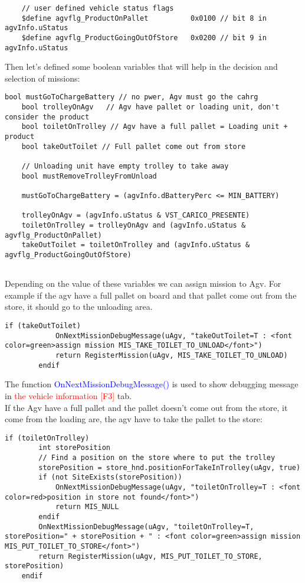 \begin{lstlisting}
	// user defined vehicle status flags
	$define agvflg_ProductOnPallet			0x0100 // bit 8 in agvInfo.uStatus
	$define agvflg_ProductGoingOutOfStore	0x0200 // bit 9 in agvInfo.uStatus
\end{lstlisting}

Then let's defined some boolean variables that will help in the decision and selection of missions:

\begin{lstlisting}[caption = Desision variables or plant status]
	bool mustGoToChargeBattery // no pwer, Agv must go the cahrg
	bool trolleyOnAgv	// Agv have pallet or loading unit, don't consider the product
	bool toiletOnTrolley // Agv have a full pallet = Loading unit + product
	bool takeOutToilet // Full pallet come out from store
	
	// Unloading unit have empty trolley to take away
	bool mustRemoveTrolleyFromUnload
	
	mustGoToChargeBattery = (agvInfo.dBatteryPerc <= MIN_BATTERY)
	
	trolleyOnAgv = (agvInfo.uStatus & VST_CARICO_PRESENTE)
	toiletOnTrolley = trolleyOnAgv and (agvInfo.uStatus & agvflg_ProductOnPallet)
	takeOutToilet = toiletOnTrolley and (agvInfo.uStatus & agvflg_ProductGoingOutOfStore)
	
\end{lstlisting} 

Depending on the value of these variables we can assign mission to Agv. For example if the agv have a full pallet on board and that pallet come out from the store, it should go to the unloading area.
\begin{lstlisting}[caption= Mission to unloaing area]
		if (takeOutToilet)
			OnNextMissionDebugMessage(uAgv, "takeOutToilet=T : <font color=green>assign mission MIS_TAKE_TOILET_TO_UNLOAD</font>")
			return RegisterMission(uAgv, MIS_TAKE_TOILET_TO_UNLOAD)
		endif
\end{lstlisting}

The function \textcolor{blue}{OnNextMissionDebugMessage()} is used to show debugging message in  \textcolor{red}{the vehicle information [F3]} tab.\\

If the Agv have a full pallet and the pallet doesn't come out from the store, it come from the loading are, the agv have to take the pallet to the store:

\begin{lstlisting}[caption= Mission take full pallet into store]
	if (toiletOnTrolley)
		int storePosition
		// Find a position on the store where to put the trolley
		storePosition = store_hnd.positionForTakeInTrolley(uAgv, true)
		if (not SiteExists(storePosition))
			OnNextMissionDebugMessage(uAgv, "toiletOnTrolley=T : <font color=red>position in store not found</font>")
			return MIS_NULL
		endif
		OnNextMissionDebugMessage(uAgv, "toiletOnTrolley=T, storePosition=" + storePosition + " : <font color=green>assign mission MIS_PUT_TOILET_TO_STORE</font>")
		return RegisterMission(uAgv, MIS_PUT_TOILET_TO_STORE, storePosition)
	endif
	
\end{lstlisting}


